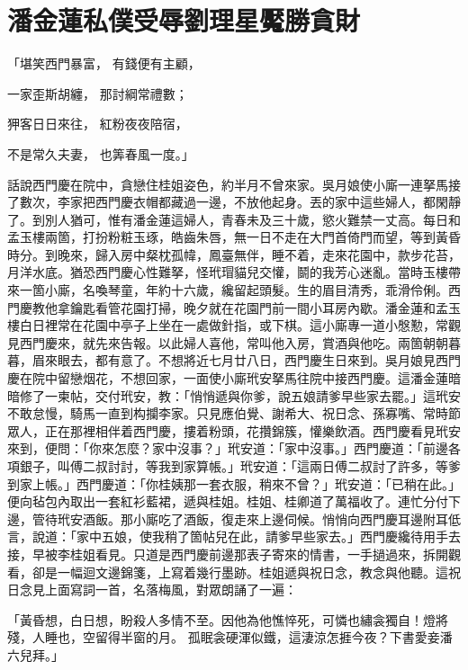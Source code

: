 %

\chapter{潘金蓮私僕受辱\KG 劉理星魘勝貪財}

「堪笑西門暴富，  有錢便有主顧，

一家歪斯胡纏，  那討綱常禮數；

狎客日日來往，  紅粉夜夜陪宿，

不是常久夫妻，  也筭春風一度。」

話說西門慶在院中，貪戀住桂姐姿色，約半月不曾來家。吳月娘使小廝一連拏馬接了數次，李家把西門慶衣帽都藏過一邊，不放他起身。丟的家中這些婦人，都閑靜了。到別人猶可，惟有潘金蓮這婦人，青春未及三十歲，慾火難禁一丈高。每日和孟玉樓兩箇，打扮粉粧玉琢，皓齒朱唇，無一日不走在大門首倚門而望，等到黃昏時分。到晚來，歸入房中粲枕孤幃，鳳臺無伴，睡不着，走來花園中，款步花苔，月洋水底。猶恐西門慶心性難拏，怪玳瑁貓兒交懽，鬬的我芳心迷亂。當時玉樓帶來一箇小廝，名喚琴童，年約十六歲，纔留起頭髮。生的眉目清秀，乖滑伶俐。西門慶教他拿鑰匙看管花園打掃，晚夕就在花園門前一間小耳房內歇。潘金蓮和孟玉樓白日裡常在花園中亭子上坐在一處做針指，或下棋。這小廝專一道小慇懃，常觀見西門慶來，就先來告報。以此婦人喜他，常叫他入房，賞酒與他吃。兩箇朝朝暮暮，眉來眼去，都有意了。不想將近七月廿八日，西門慶生日來到。吳月娘見西門慶在院中留戀烟花，不想回家，一面使小廝玳安拏馬往院中接西門慶。這潘金蓮暗暗修了一柬帖，交付玳安，教：「悄悄遞與你爹，說五娘請爹早些家去罷。」這玳安不敢怠慢，騎馬一直到构攔李家。只見應伯覺、謝希大、祝日念、孫寡嘴、常時節眾人，正在那裡相伴着西門慶，摟着粉頭，花攢錦簇，懽樂飲酒。西門慶看見玳安來到，便問：「你來怎麼？家中沒事？」玳安道：「家中沒事。」西門慶道：「前邊各項銀子，叫傅二叔討討，等我到家算帳。」玳安道：「這兩日傅二叔討了許多，等爹到家上帳。」西門慶道：「你桂姨那一套衣服，稍來不曾？」玳安道：「已稍在此。」便向毡包內取出一套紅衫藍裙，遞與桂姐。桂姐、桂卿道了萬福收了。連忙分付下邊，管待玳安酒飯。那小廝吃了酒飯，復走來上邊伺候。悄悄向西門慶耳邊附耳低言，說道：「家中五娘，使我稍了箇帖兒在此，請爹早些家去。」西門慶纔待用手去接，早被李桂姐看見。只道是西門慶前邊那表子寄來的情書，一手撾過來，拆開觀看，卻是一幅迴文邊錦箋，上寫着幾行墨跡。桂姐遞與祝日念，教念與他聽。這祝日念見上面寫詞一首，名落梅風，對眾朗誦了一遍：

「黃昏想，白日想，盼殺人多情不至。因他為他憔悴死，可憐也繡衾獨自！燈將殘，人睡也，空留得半窗的月。 孤眠衾硬渾似鐵，這淒涼怎捱今夜？下書愛妾潘六兒拜。」

